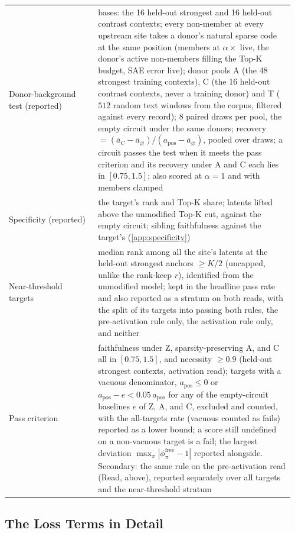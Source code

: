 \documentclass[10pt]{article}
\begin{document}
{\begin{longtable}{@{}p{0.30\linewidth}p{0.66\linewidth}@{}}
Donor-background test (reported) & bases: the 16 held-out strongest and 16 held-out contrast contexts; every non-member at every upstream site takes a donor's natural sparse code at the same position (members at $\alpha \times$ live, the donor's active non-members filling the Top-K budget, SAE error live); donor pools A (the 48 strongest training contexts), C (the 16 held-out contrast contexts, never a training donor) and T ($512$ random text windows from the corpus, filtered against every record); 8 paired draws per pool, the empty circuit under the same donors; recovery $= (\bar{a}_C - \bar{a}_{\varnothing}) / (a_{\mathrm{pos}} - \bar{a}_{\varnothing})$, pooled over draws; a circuit passes the test when it meets the pass criterion and its recovery under A and C each lies in $[0.75, 1.5]$; also scored at $\alpha = 1$ and with members clamped \\
Specificity (reported) & the target's rank and Top-K share; latents lifted above the unmodified Top-K cut, against the empty circuit; sibling faithfulness against the target's (\cref{app:specificity}) \\
Near-threshold targets & median rank among all the site's latents at the held-out strongest anchors $\geq K/2$ (uncapped, unlike the rank-keep $r$), identified from the unmodified model; kept in the headline pass rate and also reported as a stratum on both reads, with the split of its targets into passing both rules, the pre-activation rule only, the activation rule only, and neither \\
Pass criterion & faithfulness under Z, sparsity-preserving A, and C all in $[0.75, 1.5]$, and necessity $\geq 0.9$ (held-out strongest contexts, activation read); targets with a vacuous denominator, $a_{\mathrm{pos}} \leq 0$ or $a_{\mathrm{pos}} - e < 0.05\,a_{\mathrm{pos}}$ for any of the empty-circuit baselines $e$ of Z, A, and C, excluded and counted, with the all-targets rate (vacuous counted as fails) reported as a lower bound; a score still undefined on a non-vacuous target is a fail; the largest deviation $\max_{\pi} |\phi^{\mathrm{free}}_{\pi} - 1|$ reported alongside. Secondary: the same rule on the pre-activation read (Read, above), reported separately over all targets and the near-threshold stratum \\
\end{longtable}}
\FloatBarrier   %

\subsection{The Loss Terms in Detail}
\label{app:loss-details}
\end{document}
